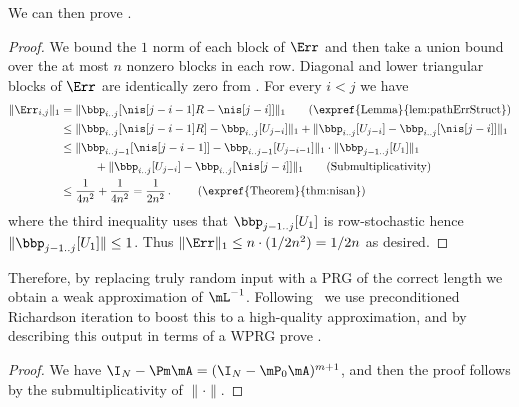 We can then prove .
\begin{proof}
We bound the $1$ norm of each block of $\Err$ and then take a union bound over the at most $n$ nonzero blocks in each row. Diagonal and lower triangular blocks of $\Err$ are identically zero from . For every $i<j$ we have 
\begin{align*}
    \|\Err_{i,j}\|_1 &=\|\bbp_{i..j}[\nis[j-i-1]R-\nis[j-i]]\|_1
    \tag*{\text{(\expref{Lemma}{lem:pathErrStruct})}}\\
    &\leq \|\bbp_{i..j}[\nis[j-i-1]R] -\bbp_{i..j}[U_{j-i}]\|_1+\|\bbp_{i..j}[U_{j-i}]- \bbp_{i..j}[\nis[j-i]]\|_1  \\
    &\leq  \|\bbp_{i..j-1}[\nis[j-i-1]] -\bbp_{i..j-1}[U_{j-i-1}]\|_1\cdot\|\bbp_{j-1..j}[U_1]\|_1\\ 
%
%
%
%
%
    &\quad\quad\quad + \|\bbp_{i..j}[U_{j-i}]- \bbp_{i..j}[\nis[j-i]]\|_1 %
    \tag*{\text{(Submultiplicativity)}} \\
    &\leq \frac{1}{4n^2}+\frac{1}{4n^2} = \frac{1}{2n^2}\,. %
    \tag*{
%
       \text{(\expref{Theorem}{thm:nisan})}}%
\end{align*}
%
where %
the third inequality uses that $\bbp_{j-1..j}[U_1]$ is row-stochastic hence $\|\bbp_{j-1..j}[U_1]\|\leq 1$.
Thus $\|\Err\|_1 \leq n\cdot(1/2n^2)= 1/2n$ as desired.
\end{proof}

Therefore, by replacing truly random input with a PRG of the correct length we obtain a weak approximation of $\mL^{-1}$. Following~\cite{AhmadinejadKeMuPeSiVa19} we use preconditioned Richardson iteration to boost this to a %
high-quality  %
approximation, and by describing this output in terms of a WPRG prove .

\Richardson*
\begin{proof}
We have $\I_N-\Pm\mA= (\I_N-\mP_0\mA)^{m+1}$, and then the proof follows by the submultiplicativity of $\|\cdot\|$.
\end{proof}

